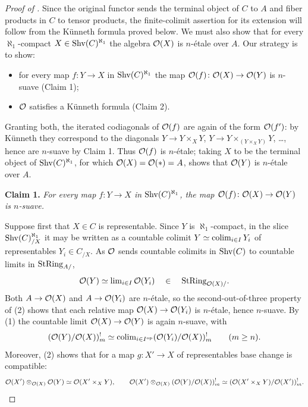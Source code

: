 \documentclass[11pt]{book}
\begin{document}
	\begin{proof}[Proof of ]
		Since the original functor sends the terminal object of $C$ to $A$ and fiber products in $C$ to tensor products, the finite-colimit assertion for its extension will follow from the Künneth formula proved below. We must also show that for every $\aleph_1$-compact $X \in \operatorname{Shv}(C)^{\aleph_1}$ the algebra $\mathcal{O}(X)$ is $n$-\'etale over $A$. Our strategy is to show:
		\begin{itemize}
			\item for every map $f\colon Y \to X$ in $\operatorname{Shv}(C)^{\aleph_1}$ the map $\mathcal{O}(f)\colon \mathcal{O}(X) \to \mathcal{O}(Y)$ is $n$-suave (Claim 1);
			\item $\mathcal{O}$ satisfies a Künneth formula (Claim 2).
		\end{itemize}
		Granting both, the iterated codiagonals of $\mathcal{O}(f)$ are again of the form $\mathcal{O}(f')$: by Künneth they correspond to the diagonals $Y \to Y \times_X Y$, $Y \to Y \times_{(Y \times_X Y)} Y$, \dots, hence are $n$-suave by Claim 1. Thus $\mathcal{O}(f)$ is $n$-\'etale; taking $X$ to be the terminal object of $\operatorname{Shv}(C)^{\aleph_1}$, for which $\mathcal{O}(X) = \mathcal{O}(\ast) = A$, shows that $\mathcal{O}(Y)$ is $n$-\'etale over $A$.

		\textbf{Claim 1.} \emph{For every map $f\colon Y \to X$ in $\operatorname{Shv}(C)^{\aleph_1}$, the map $\mathcal{O}(f)\colon \mathcal{O}(X) \to \mathcal{O}(Y)$ is $n$-suave.}

		Suppose first that $X \in C$ is representable. Since $Y$ is $\aleph_1$-compact, in the slice $\operatorname{Shv}(C)^{\aleph_1}_{/X}$ it may be written as a countable colimit $Y \simeq \operatorname{colim}_{i \in I} Y_i$ of representables $Y_i \in C_{/X}$. As $\mathcal{O}$ sends countable colimits in $\operatorname{Shv}(C)$ to countable limits in ${\textup{StRing}}_{A/}$,
		\[
			\mathcal{O}(Y) \simeq \operatorname{lim}_{i \in I} \mathcal{O}(Y_i) \quad\in\quad {\textup{StRing}}_{\mathcal{O}(X)/}.
		\]
		Both $A \to \mathcal{O}(X)$ and $A \to \mathcal{O}(Y_i)$ are $n$-\'etale, so the second-out-of-three property of (2) shows that each relative map $\mathcal{O}(X) \to \mathcal{O}(Y_i)$ is $n$-\'etale, hence $n$-suave. By (1) the countable limit $\mathcal{O}(X) \to \mathcal{O}(Y)$ is again $n$-suave, with
		\[
			(\mathcal{O}(Y)/\mathcal{O}(X))^!_m \simeq \operatorname{colim}_{i \in I^{\textup{op}}} (\mathcal{O}(Y_i)/\mathcal{O}(X))^!_m \qquad (m \geq n).
		\]
		Moreover, (2) shows that for a map $g\colon X' \to X$ of representables base change is compatible:
		\[
			\mathcal{O}(X') \otimes_{\mathcal{O}(X)} \mathcal{O}(Y) \simeq \mathcal{O}(X' \times_X Y), \qquad
			\mathcal{O}(X') \otimes_{\mathcal{O}(X)} (\mathcal{O}(Y)/\mathcal{O}(X))^!_m \simeq (\mathcal{O}(X' \times_X Y)/\mathcal{O}(X'))^!_m.
		\]


\end{proof}
\end{document}

